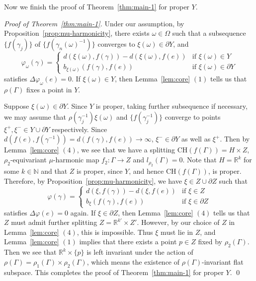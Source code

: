 \documentclass[12pt]{amsart}
\numberwithin{equation}{section}
\theoremstyle{plain}
\theoremstyle{definition}
\theoremstyle{remark}
\newcommand{\R}{{\mathbb R}}
\newcommand{\N}{{\mathbb N}}
\newcommand{\ch}[1]{\mathrm{CH}(#1)}
\begin{document}
\medskip
Now we finish the proof of Theorem~\ref{thm:main-1} for proper $Y$.

\medskip

\noindent
{\it Proof of Theorem~\ref{thm:main-1}.}
Under our assumption, by Proposition~\ref{prop:mu-harmonicity}, 
there exists $\omega \in \Omega$ such that 
a subsequence $\{f(\gamma_j)\}$ of $\{f(\gamma_n(\omega)^{-1})\}$
converges to $\xi(\omega) \in \partial Y$, and 
\begin{equation*}
 \varphi_{\omega}(\gamma)= 
 \begin{cases}
  d(\xi(\omega),f(\gamma)) - d(\xi(\omega),f(e)) & \text{if }\xi(\omega)
  \in Y \\
  b_{\xi(\omega)}(f(\gamma), f(e))  & \text{if }\xi(\omega) \in \partial Y
 \end{cases}
\end{equation*}
satisfies $\Delta \varphi_{\omega}(e)=0$. 
If $\xi(\omega) \in Y$, then Lemma~\ref{lem:core} $(1)$ tells us that
$\rho(\Gamma)$ fixes a point in $Y$. 

Suppose $\xi(\omega) \in \partial Y$. 
Since $Y$ is proper, taking further subsequence if necessary, we may
assume that $\rho(\gamma_j^{-1})\xi(\omega)$ and $\{f(\gamma_j^{-1})\}$
converge to points $\xi^+, \xi^- \in Y\cup \partial Y$
respectively. 
Since $d(f(e),f(\gamma^{-1}))=d(f(\gamma),f(e))\to \infty$, 
$\xi^- \in \partial Y$ as well as $\xi^+$. 
Then by Lemma~\ref{lem:core} $(4)$, we see that we have
a splitting $\ch{f(\Gamma)}=H \times Z$, 
$\rho_2$-equivariant $\mu$-harmonic map 
$f_2 \colon \Gamma \rightarrow Z$ and $l_{\rho_2}(\Gamma)=0$. 
Note that $H=\R^k$ for some $k \in \N$ and that $Z$ is proper, since
$Y$, and hence $\ch{f(\Gamma)}$, is proper. 
Therefore, by Proposition~\ref{prop:mu-harmonicity}, we have 
$\xi \in Z \cup \partial Z$ such that
\begin{equation*}
 \varphi(\gamma) =
 \begin{cases}
  d(\xi,f(\gamma))-d(\xi,f(e)) & \text{if } \xi \in Z \\
  b_{\xi}(f(\gamma),f(e)) & \text{if } \xi \in \partial Z
 \end{cases}
\end{equation*}
satisfies $\Delta \varphi(e)=0$ again. 
If $\xi \in \partial Z$, then Lemma~\ref{lem:core} $(4)$ tells us that
$Z$ must admit further splitting $Z = \R^{k'}\times Z'$.
However, by our choice of $Z$ in Lemma~\ref{lem:core} $(4)$, this is
impossible. 
Thus $\xi$ must lie in $Z$, and Lemma~\ref{lem:core} $(1)$ implies that
there exists a point $p \in Z$ fixed by $\rho_2(\Gamma)$. 
Then we see that $\R^k \times \{p\}$ is left invariant under the action
of $\rho(\Gamma)=\rho_1(\Gamma)\times \rho_2(\Gamma)$, which means the
existence of $\rho(\Gamma)$-invariant flat subspace. 
This completes the proof of Theorem~\ref{thm:main-1} for proper $Y$.
\qed
\end{document}
